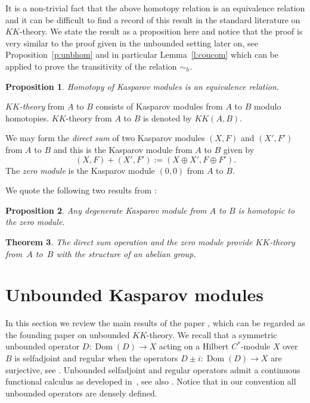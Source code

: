 \documentclass[11pt]{article}
\numberwithin{equation}{section}
\newtheorem{Theorem}{Theorem}[section]
\newtheorem{prop}[Theorem]{Proposition}
 { \theoremstyle{definition}
\newtheorem{dfn}[Theorem]{Definition}
\newtheorem{exa}[Theorem]{Example}
\newtheorem{rem}[Theorem]{Remark} }
\newcommand{\op}{\oplus}
\begin{document}
It is a non-trivial fact that the above homotopy relation is an equivalence relation and it can be difficult to find a record of this result in the standard literature on $KK$-theory. We state the result as a proposition here and notice that the proof is very similar to the proof given in the unbounded setting later on, see Proposition~\ref{p:unbhom} and in particular Lemma~\ref{l:coucom} which can be applied to prove the transitivity of the relation $\sim_h$.

\begin{prop}Homotopy of Kasparov modules is an equivalence relation.
\end{prop}

\begin{dfn}\emph{$KK$-theory} from $A$ to $B$ consists of Kasparov modules from $A$ to $B$ modulo homotopies. $KK$-theory from $A$ to $B$ is denoted by $KK(A,B)$.
\end{dfn}

We may form the \emph{direct sum} of two Kasparov modules $(X,F)$ and $(X',F')$ from $A$ to $B$ and this is the Kasparov module from $A$ to $B$ given by
\[
(X,F) + (X',F') := (X \op X', F \op F') .
\]
The \emph{zero module} is the Kasparov module $(0,0)$ from $A$ to $B$.

We quote the following two results from \cite[Chapter~17]{Bla:KOA}:

\begin{prop}\label{p:degbou}Any degenerate Kasparov module from $A$ to $B$ is homotopic to the zero module.
\end{prop}

\begin{Theorem}The direct sum operation and the zero module provide $KK$-theory from~$A$ to~$B$ with the structure of an abelian group.
\end{Theorem}

\section{Unbounded Kasparov modules}
In this section we review the main results of the paper \cite{BaJu:TBK}, which can be regarded as the founding paper on unbounded $KK$-theory. We recall that a symmetric unbounded operator $D\colon \operatorname{Dom}(D) \to X$ acting on a Hilbert $C^*$-module $X$ over $B$ is selfadjoint and regular when the operators $D \pm i\colon \operatorname{Dom}(D) \to X$ are surjective, see \cite[Lemmas~9.7 and~9.8]{Lan:HCM}. Unbounded selfadjoint and regular operators admit a continuous functional calculus as developed in~\cite{Wor:UAQ,WoNa:OTC}, see also \cite[Theorem~10.9]{Lan:HCM}. Notice that in our convention all unbounded operators are densely defined.
\end{document}
